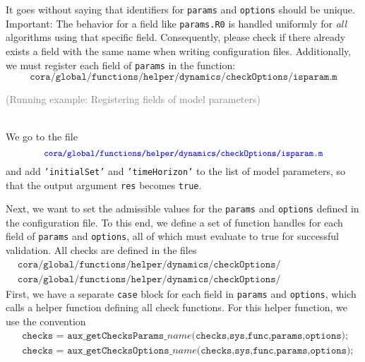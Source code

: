 It goes without saying that identifiers for \texttt{params} and \texttt{options} should be unique.
Important: The behavior for a field like \texttt{params.R0} is handled uniformly for \emph{all} algorithms using that specific field.
Consequently, please check if there already exists a field with the same name when writing configuration files.
Additionally, we must register each field of \texttt{params} in the function:
\begin{equation*}
	\texttt{cora/global/functions/helper/dynamics/checkOptions/isparam.m}
\end{equation*}

\begin{tcolorbox}
	\begin{scriptsize} \textcolor{gray}{(Running example: Registering fields of model parameters)} \end{scriptsize} \\
	We go to the file
	\begin{equation*}
		\textcolor{blue}{\small{\texttt{cora/global/functions/helper/dynamics/checkOptions/isparam.m}}}
	\end{equation*}
	and add \texttt{'initialSet'} and \texttt{'timeHorizon'} to the list of model parameters, so that the output argument \texttt{res} becomes \texttt{true}.
\end{tcolorbox}


Next, we want to set the admissible values for the \texttt{params} and \texttt{options} defined in the configuration file.
To this end, we define a set of function handles for each field of \texttt{params} and \texttt{options}, all of which must evaluate to true for successful validation.
All checks are defined in the files
\begin{align*}
	&\texttt{cora/global/functions/helper/dynamics/checkOptions/checkDynParameterParams.m} \\
	&\texttt{cora/global/functions/helper/dynamics/checkOptions/checkDynParameterOptions.m}
\end{align*}
First, we have a separate \texttt{case} block for each field in \texttt{params} and \texttt{options}, which calls a helper function defining all check functions.
For this helper function, we use the convention
\begin{align*}
	&\texttt{checks = aux\_getChecksParams\_}\textit{name}\texttt{(checks,sys,func,params,options);} \\
	&\texttt{checks = aux\_getChecksOptions\_}\textit{name}\texttt{(checks,sys,func,params,options);}
\end{align*}

